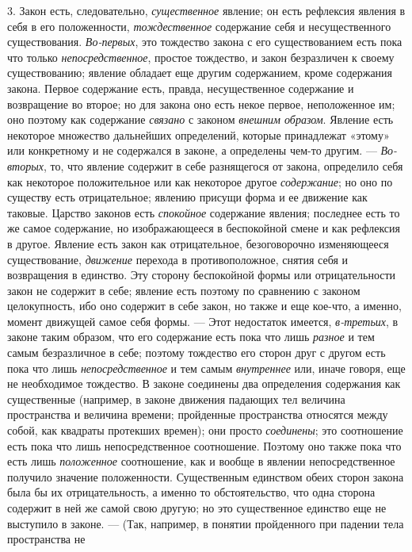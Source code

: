 3. Закон есть, следовательно, {\em существенное}
явление; он есть рефлексия явления в себя в его положенности,
{\em тождественное} содержание себя и несущественного
существования. {\em Во-первых}, это тождество закона с
его существованием есть пока что только
{\em непосредственное}, простое тождество, и закон
безразличен к своему существованию; явление обладает еще другим
содержанием, кроме содержания закона. Первое содержание есть, правда,
несущественное содержание и возвращение во второе; но для закона оно есть
некое первое, неположенное им; оно поэтому как содержание
{\em связано} с законом
{\em внешним образом}. Явление есть некоторое множество
дальнейших определений, которые принадлежат «этому» или конкретному и не
содержался в законе, а определены чем-то другим. —
{\em Во-вторых}, то, что явление содержит в себе
разнящегося от закона, определило себя как некоторое положительное или как
некоторое другое {\em содержание}; но оно по существу
есть отрицательное; явлению присущи форма и ее движение как таковые.
Царство законов есть {\em спокойное} содержание
явления; последнее есть то же самое содержание, но изображающееся в
беспокойной смене и как рефлексия в другое. Явление есть закон как
отрицательное, безоговорочно изменяющееся существование,
{\em движение} перехода в противоположное, снятия себя
и возвращения в единство. Эту сторону беспокойной формы или отрицательности
закон не содержит в себе; явление есть поэтому по сравнению с законом
целокупность, ибо оно содержит в себе закон, но также и еще кое-что, а
именно, момент движущей самое себя формы. — Этот недостаток имеется,
{\em в-третьих}, в законе таким образом, что его
содержание есть пока что лишь {\em разное} и тем самым
безразличное в себе; поэтому тождество его сторон друг с другом есть пока
что лишь {\em непосредственное} и тем самым
{\em внутреннее} или, иначе говоря, еще не необходимое
тождество. В законе соединены два определения содержания как существенные
(например, в законе движения падающих тел величина пространства и величина
времени; пройденные пространства относятся между собой, как квадраты
протекших времен); они просто {\em соединены}; это
соотношение есть пока что лишь непосредственное соотношение. Поэтому оно
также пока что есть лишь {\em положенное} соотношение,
как и вообще в явлении непосредственное получило значение положенности.
Существенным единством обеих сторон закона была бы их отрицательность, а
именно то обстоятельство, что одна сторона содержит в ней же самой свою
другую; но это существенное единство еще не выступило в законе. — (Так,
например, в понятии пройденного при падении тела пространства не
